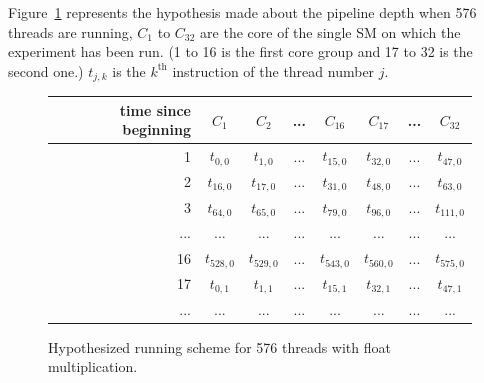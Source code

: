 \documentclass{report}
\begin{document}
    Figure~\ref{fig:fp_prediction_512}
    represents the hypothesis made about the pipeline depth when 576 threads are running, $C_1$ to
    $C_{32}$ are the core of the single SM on which the experiment has been run. (1 to 16 is the
    first core group and 17 to 32 is the second one.) $t_{j,k}$ is the $k^{\text{th}}$ instruction of the thread number $j$. 
        \begin{figure}[H]
      \centering
       \begin{tabular}{ | r || c | c | c | c || c | c | c | }
    	    \hline
    	    time since beginning & $C_1$ & $C_2$ & ... & $C_{16}$ & $C_{17}$ & ... & $C_{32}$ \\ \hline  \hline
    	   1 & $t_{0,0}$ & $t_{1,0}$ & ... & $t_{15,0}$ & $t_{32, 0}$ & ... & $t_{47, 0}$ \\ \hline 
    	   2 & $t_{16,0}$ & $t_{17,0}$ & ... & $t_{31,0}$ & $t_{48, 0}$ & ... & $t_{63, 0}$ \\ \hline
    	   3 & $t_{64,0}$ & $t_{65,0}$ & ... & $t_{79,0}$ & $t_{96, 0}$ & ... & $t_{111, 0}$ \\ \hline
    	   ... & ... & ... & ... & ... & ... & ... & ... \\ \hline
    	   16 & $t_{528,0}$ & $t_{529,0}$ & ... & $t_{543,0}$ & $t_{560,0}$ & ... & $t_{575, 0}$ \\ \hline
    	   17 & $t_{0,1}$ & $t_{1,1}$ & ... & $t_{15,1}$ & $t_{32, 1}$ & ... & $t_{47, 1}$ \\ \hline
    	   ... & ... & ... & ... & ... & ... & ... & ... \\ \hline
  	\end{tabular}
  	\captionsetup{justification=centering}
  	\caption{Hypothesized running scheme for 576 threads with float multiplication.}
  	\label{fig:fp_prediction_512}
   \end{figure}
   
\end{document}
